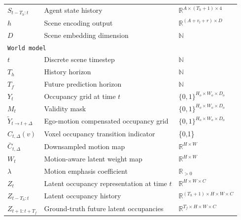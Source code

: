 \documentclass[runningheads]{llncs}
\begin{document}
{\begin{longtable}{lll}
$S_{t-T_h:t}$ & Agent state history & $\mathbb{R}^{A \times (T_h+1) \times 4}$ \\

$h$ & Scene encoding output & $\mathbb{R}^{(A + v_l + r) \times D}$ \\

$D$ & Scene embedding dimension & $\mathbb N$ \\

\midrule


\multicolumn{3}{l}{\texttt{World model}} \\

$t$ & Discrete scene timestep & $\mathbb N$ \\
$T_h$ & History horizon & $\mathbb N$ \\
$T_f$ & Future prediction horizon & $\mathbb N$ \\


$Y_t$ & Occupancy grid at time $t$ & $\{0,1\}^{H_o \times W_o \times D_o}$ \\
$M_t$ & Validity mask & $\{0,1\}^{H_o \times W_o \times D_o}$ \\

$\tilde{Y}_{t\rightarrow t+\Delta}$ & Ego-motion compensated occupancy grid & $\{0,1\}^{H_o \times W_o \times D_o}$ \\

$C_{t,\Delta}(v)$ & Voxel occupancy transition indicator & \{0,1\} \\

$\bar{C}_{t,\Delta}$ & Downsampled motion map & $\mathbb{R}^{H \times W}$ \\

$W_t$ & Motion-aware latent weight map & $\mathbb{R}^{H \times W}$ \\

$\lambda$ & Motion emphasis coefficient & $\mathbb{R}_{>0}$ \\

$Z_t$ & Latent occupancy representation at time $t$ & $\mathbb{R}^{H \times W \times C}$ \\

$Z_{t-T_h:t}$ & Latent occupancy history & $\mathbb{R}^{(T_h+1)\times H \times W \times C}$ \\

$Z_{t+1:t+T_f}$ & Ground-truth future latent occupancies & $\mathbb{R}^{T_f \times H \times W \times C}$ \\


\end{longtable}}
\end{document}
